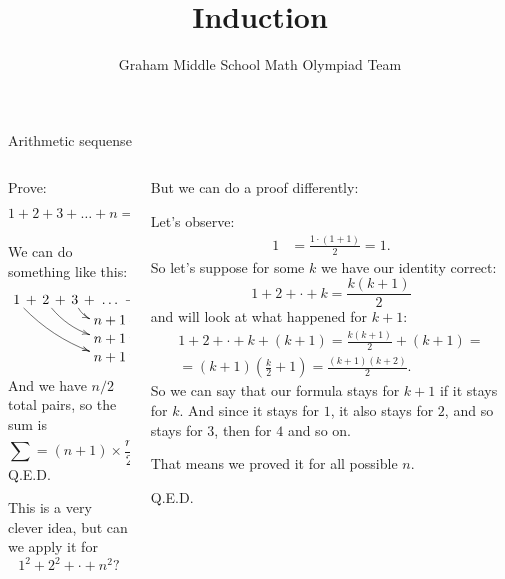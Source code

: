 \documentclass[9pt,aspectratio=169,handout]{beamer}
\title{Induction}
\subtitle[Graham Middle School]{Graham Middle School Math Olympiad Team}
\begin{document}
\maketitle

\begin{frame}{Arithmetic sequense}
  \begin{columns}[T]
    \begin{column}{0.5\textwidth}
      \begin{problem}
        Prove:
        \[
          1 + 2 + 3 + \dots + n = \frac{n (n+1)}{2}.
        \]
      \end{problem}\pause

      We can do something like this:
      \[ \xymatrix@C=-2pt@R=0pt{
        1\ar@/_/[dddrrrrr] & + & 2\ar@/_/[ddrrr] & + & 3\ar@/_/[dr] & +\ \ldots\ + & (n-2)\ar@/^/[dl] & + & (n-1)\ar@/^/[ddlll] & + & n\ar@/^/[dddlllll] \\
        & & & & & n+1 & & & & & \\
        & & & & & n+1 & & & & & \\
        & & & & & n+1 & & & & & 
      } \]
      And we have $n/2$ total pairs, so the sum is
      \[
        \sum = (n+1) \times \frac{n}{2} = \frac{n(n+1)}{2}.
      \]
      \hfill Q.E.D.\pause

      This is a very clever idea, but can we apply it for 
      \[ 1^2 + 2^2 + \cdot + n^2? \]\pause
    \end{column}
    \begin{column}{0.5\textwidth}
      But we can do a proof differently:
      
      Let's observe:
      \begin{align*}
        1 &= \frac{1 \cdot ( 1 + 1)}{2} = 1.
      \end{align*}\pause
      So let's suppose for some $k$ we have our identity correct:
      \[ 1 + 2 + \cdot + k = \frac{k (k + 1)}{2} \]\pause
      and will look at what happened for $k+1$:
      \begin{multline*} 
        1 + 2 + \cdot + k + (k+1) = \frac{k (k+1)}{2} + (k+1) =\\
        = (k+1) \left(\frac{k}{2} + 1\right) = \frac{(k+1)(k+2)}{2}. 
      \end{multline*}\pause
      So we can say that our formula stays for $k+1$ if it stays for $k$. And since it stays for $1$, it also stays for $2$, and so stays for $3$, then for $4$ and so on. 

      That means we proved it for all possible $n$. 

      \hfill Q.E.D.
    \end{column}
  \end{columns}
\end{frame}
\end{document}
